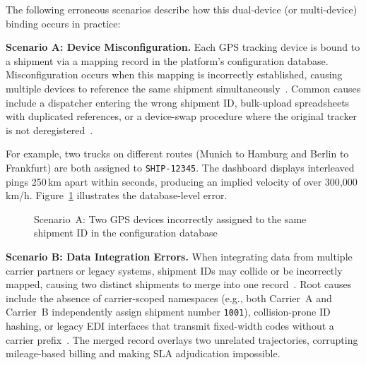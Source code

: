 The following erroneous scenarios describe how this dual-device (or multi-device) binding occurs in practice:

\textbf{Scenario A: Device Misconfiguration.}
Each GPS tracking device is bound to a shipment via a mapping record in the platform's configuration database. Misconfiguration occurs when this mapping is incorrectly established, causing multiple devices to reference the same shipment simultaneously~\cite{nmfta2023provisioning, 1ot2024connectivity}. Common causes include a dispatcher entering the wrong shipment ID, bulk-upload spreadsheets with duplicated references, or a device-swap procedure where the original tracker is not deregistered~\cite{samsara2023devicehealth}.

For example, two trucks on different routes (Munich to Hamburg and Berlin to Frankfurt) are both assigned to \texttt{SHIP-12345}. The dashboard displays interleaved pings 250\,km apart within seconds, producing an implied velocity of over 300{,}000\,km/h. Figure~\ref{fig:scenario_a} illustrates the database-level error.

\begin{figure}[ht]
\centering
{}
\caption{Scenario~A: Two GPS devices incorrectly assigned to the same shipment ID in the configuration database}
\label{fig:scenario_a}
\end{figure}

\textbf{Scenario B: Data Integration Errors.}
When integrating data from multiple carrier partners or legacy systems, shipment IDs may collide or be incorrectly mapped, causing two distinct shipments to merge into one record~\cite{project44_2021dataquality, ecosio2025edierrors}. Root causes include the absence of carrier-scoped namespaces (e.g., both Carrier~A and Carrier~B independently assign shipment number \texttt{1001}), collision-prone ID hashing, or legacy EDI interfaces that transmit fixed-width codes without a carrier prefix~\cite{datadocks2024edi}. The merged record overlays two unrelated trajectories, corrupting mileage-based billing and making SLA adjudication impossible.

